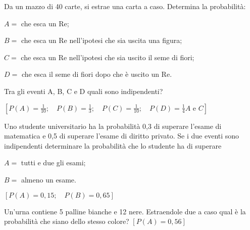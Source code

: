 \begin{esercizio}[\Ast]
 \label{ese:9.61}
 Da un mazzo di 40 carte, si estrae una carta a caso. Determina la probabilità:
\begin{itemize*}
\item \( A= \) che esca un Re;
\item \( B= \) che esca un Re nell'ipotesi che sia uscita una figura;
\item \( C= \) che esca un Re nell'ipotesi che sia uscito il seme di fiori;
\item \( D= \) che esca il seme di fiori dopo che è uscito un Re.
\end{itemize*}
Tra gli eventi A, B, C e D quali sono indipendenti?

\hfill \(\left[P(A)=\frac 1{10} ; \quad  P(B)=\frac 1 3 ; \quad  P(C)=\frac 
1{10} ; \quad  P(D)=\frac 1 4 A \text{ e } C\right]\)
\end{esercizio}

\begin{esercizio}[\Ast]
 \label{ese:9.62}
Uno studente universitario ha la probabilità 0,3 di superare l'esame di 
matematica e 0,5 di superare l'esame di diritto privato. Se i due eventi sono 
indipendenti determinare la probabilità che lo studente ha di superare
\begin{itemize*}
\item \( A= \) tutti e due gli esami;
\item \( B= \) almeno un esame.
\end{itemize*}
\hfill \(\left[P(A)=0,15; \quad P(B)=0,65\right]\)
\end{esercizio}

\begin{esercizio}[\Ast]
 \label{ese:9.63}
Un'urna contiene 5 palline bianche e 12 nere. Estraendole due a caso qual è la 
probabilità che siano dello stesso colore?
\hfill \(\left[P(A)=0,56\right]\)
\end{esercizio}

